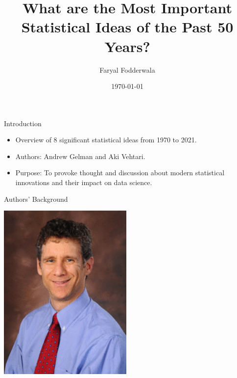 \documentclass{beamer}
\title{What are the Most Important Statistical Ideas of the Past 50 Years?}
\author{Faryal Fodderwala}
\date{\today}
\begin{document}
\frame{\titlepage}

\begin{frame}{Introduction}
\begin{itemize}
    \item Overview of 8 significant statistical ideas from 1970 to 2021.
    \item Authors: Andrew Gelman and Aki Vehtari.
    \item Purpose: To provoke thought and discussion about modern statistical innovations and their impact on data science.
\end{itemize}
\end{frame}

\begin{frame}{Authors' Background}
\begin{minipage}{0.3\textwidth}
    \includegraphics[width=\textwidth]{andrew_gelman.png} %

\end{minipage}
\end{frame}
\end{document}
